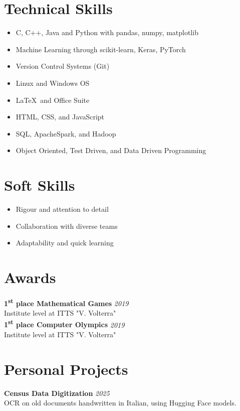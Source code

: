\documentclass[a4paper,10pt]{article}
\begin{document}
\begin{minipage}[t]{0.33\textwidth}
    \section*{Technical Skills}
    \vspace{-0.1cm}
    \begin{itemize}[left=0.2cm, label={\textbullet}]
        \item C, C++, Java and Python with pandas, numpy, matplotlib
        \item Machine Learning through scikit-learn, Keras, PyTorch
        \item Version Control Systems (Git)
        \item Linux and Windows OS
        \item \LaTeX \, and Office Suite
        \item HTML, CSS, and JavaScript
        \item SQL, ApacheSpark, and Hadoop
        \item Object Oriented, Test Driven, and Data Driven Programming
    \end{itemize}

    \section*{Soft Skills}
    \begin{itemize}[left=0.2cm, label={\textbullet}]
        \item Rigour and attention to detail
        \item Collaboration with diverse teams
        \item Adaptability and quick learning
    \end{itemize}

    \section*{Awards}
        \textbf{1\textsuperscript{st} place Mathematical Games} \hfill \textit{2019} \\ Institute level at ITTS "V. Volterra" \\

        \textbf{1\textsuperscript{st} place Computer Olympics} \hfill \textit{2019} \\ Institute level at ITTS "V. Volterra"

    \section*{Personal Projects}
        \textbf{Census Data Digitization} \hfill \textit{2025} \\
        OCR on old documents handwritten in Italian, using Hugging Face models. \\
        

\end{minipage}
\end{document}
